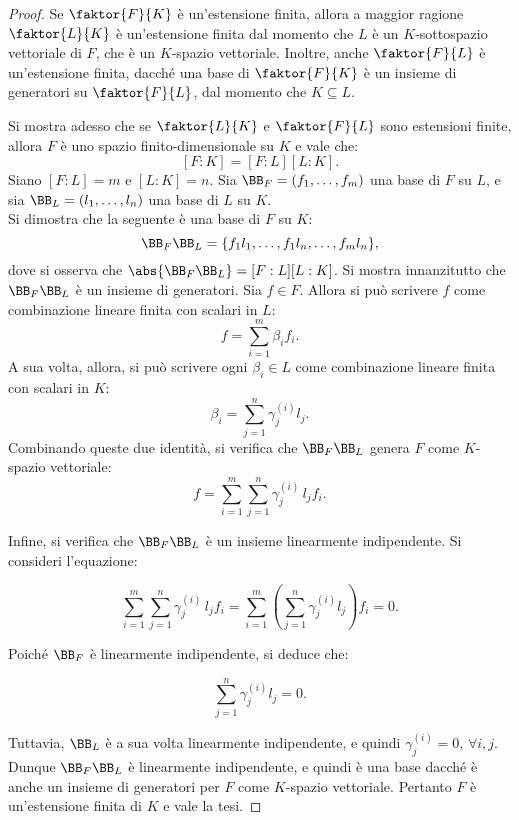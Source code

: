 \documentclass[12pt]{scrartcl}
\begin{document}
	\begin{proof}
		Se $\faktor{F}{K}$ è un'estensione finita, allora a
		maggior ragione $\faktor{L}{K}$ è un'estensione finita
		dal momento che $L$ è un $K$-sottospazio vettoriale di
		$F$, che è un $K$-spazio vettoriale. Inoltre,
		anche $\faktor{F}{L}$ è un'estensione finita, dacché
		una base di $\faktor{F}{K}$ è un insieme di generatori
		su $\faktor{F}{L}$, dal momento che $K \subseteq L$. \medskip
		
		
		Si mostra adesso che se $\faktor{L}{K}$ e $\faktor{F}{L}$ sono estensioni finite, allora $F$ è uno spazio
		finito-dimensionale su $K$ e vale che:
		\[ [F : K] = [F : L] [L : K]. \]
		Siano $[F : L] = m$ e $[L : K] = n$. Sia
		$\BB_F = (f_1, \ldots, f_m)$ una base
		di $F$ su $L$, e sia $\BB_L = (l_1, \ldots, l_n)$ una
		base di $L$ su $K$. \\
		
		Si dimostra che la seguente è una base di $F$ su $K$:
		\[\BB_F \BB_L = \{ f_1 l_1, \ldots, f_1 l_n, \ldots, f_m l_n\}, \]
		dove si osserva che $\abs{\BB_F \BB_L} = [F : L] [L : K]$.
		Si mostra innanzitutto che $\BB_F \BB_L$ è un insieme
		di generatori. Sia $f \in F$.
		Allora si può scrivere $f$ come combinazione lineare
		finita con scalari in $L$:
		\[f = \sum_{i=1}^m \beta_i f_i.\]
		A sua volta, allora, si può scrivere ogni $\beta_i \in L$
		come combinazione lineare finita con scalari in $K$:
		\[\beta_i = \sum_{j=1}^n \gamma_j^{(i)} l_j.\]
		Combinando queste due identità, si verifica che
		$\BB_F \BB_L$ genera $F$ come $K$-spazio vettoriale:
		\[ f = \sum_{i=1}^m \sum_{j=1}^n \gamma_j^{(i)} \, l_j f_i. \]

		
		Infine, si verifica che $\BB_F \BB_L$ è un insieme linearmente
		indipendente. Si consideri l'equazione:
		
		\[ \sum_{i=1}^m \sum_{j=1}^n \gamma_j^{(i)} \, l_j f_i = \sum_{i=1}^m \left(\sum_{j=1}^n \gamma_j^{(i)} l_j \right) f_i = 0. \]
		
		Poiché $\BB_F$ è linearmente indipendente, si deduce
		che:
		
		\[ \sum_{j=1}^n \gamma_j^{(i)} l_j = 0. \]
		
		Tuttavia, $\BB_L$ è a sua volta linearmente indipendente,
		e quindi $\gamma_j^{(i)} = 0$, $\forall i, j$. Dunque
		$\BB_F \BB_L$ è linearmente indipendente, e quindi è
		una base dacché è anche un insieme di generatori per
		$F$ come $K$-spazio vettoriale. Pertanto $F$ è un'estensione
		finita di $K$ e vale la tesi.
	\end{proof}
\end{document}
